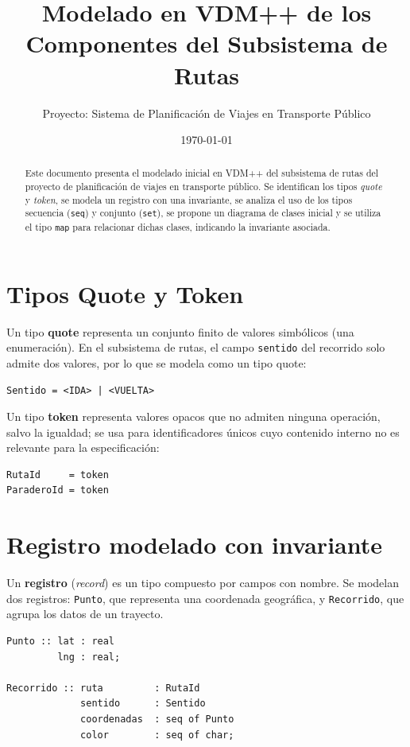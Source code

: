 \documentclass[11pt,a4paper]{article}
\title{\textbf{Modelado en VDM++ de los Componentes del Subsistema de Rutas}}
\author{Proyecto: Sistema de Planificación de Viajes en Transporte Público}
\date{\today}
\begin{document}
\maketitle

\begin{abstract}
Este documento presenta el modelado inicial en VDM++ del subsistema de rutas del proyecto de planificación de viajes en transporte público. Se identifican los tipos \emph{quote} y \emph{token}, se modela un registro con una invariante, se analiza el uso de los tipos secuencia (\texttt{seq}) y conjunto (\texttt{set}), se propone un diagrama de clases inicial y se utiliza el tipo \texttt{map} para relacionar dichas clases, indicando la invariante asociada.
\end{abstract}

\section{Tipos Quote y Token}

Un tipo \textbf{quote} representa un conjunto finito de valores simbólicos (una enumeración). En el subsistema de rutas, el campo \texttt{sentido} del recorrido solo admite dos valores, por lo que se modela como un tipo quote:

\begin{lstlisting}
Sentido = <IDA> | <VUELTA>
\end{lstlisting}

Un tipo \textbf{token} representa valores opacos que no admiten ninguna operación, salvo la igualdad; se usa para identificadores únicos cuyo contenido interno no es relevante para la especificación:

\begin{lstlisting}
RutaId     = token
ParaderoId = token
\end{lstlisting}

\section{Registro modelado con invariante}

Un \textbf{registro} (\emph{record}) es un tipo compuesto por campos con nombre. Se modelan dos registros: \texttt{Punto}, que representa una coordenada geográfica, y \texttt{Recorrido}, que agrupa los datos de un trayecto.

\begin{lstlisting}
Punto :: lat : real
         lng : real;

Recorrido :: ruta         : RutaId
             sentido      : Sentido
             coordenadas  : seq of Punto
             color        : seq of char;
\end{lstlisting}
\end{document}
